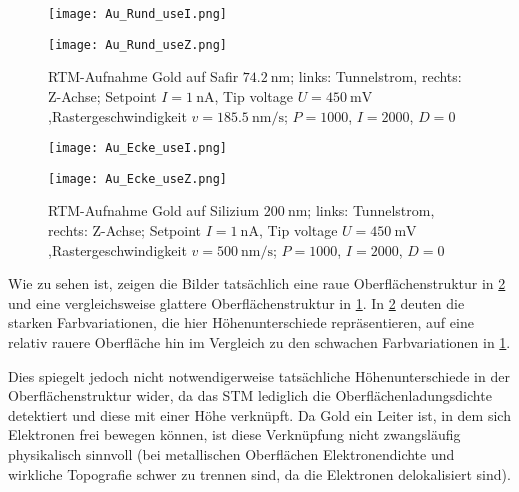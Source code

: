 \begin{figure}[H]
    \centering
    \begin{minipage}[t]{0.495\textwidth}
        \centering
        \texttt{[image: Au\_Rund\_useI.png]}
        \label{fig:goldrund_I}
    \end{minipage}
    \hfill
    \begin{minipage}[t]{0.495\textwidth}
        \centering
        \texttt{[image: Au\_Rund\_useZ.png]}
        \label{fig:goldrund_Z}
    \end{minipage}
    \caption{
      RTM-Aufnahme Gold auf Safir $\SI{74.2}{\nm}$; links: Tunnelstrom, rechts: Z-Achse; Setpoint $I = \SI{1}{\nano\ampere}$, Tip voltage $U = \SI{450}{\milli\volt}$,Rastergeschwindigkeit $v = \SI{185.5}{\nano\meter\per\second}$; $P = 1000$, $I = 2000$, $D = 0$
}
    \label{fig:goldrund_combined}
\end{figure}

\begin{figure}[H]
    \centering
    \begin{minipage}[t]{0.495\textwidth}
        \centering
        \texttt{[image: Au\_Ecke\_useI.png]}
        \label{fig:goldecke_I}
    \end{minipage}
    \hfill
    \begin{minipage}[t]{0.495\textwidth}
        \centering
        \texttt{[image: Au\_Ecke\_useZ.png]}
        \label{fig:goldecke_Z}
    \end{minipage}
    \caption{
      RTM-Aufnahme Gold auf Silizium $\SI{200}{\nm}$; links: Tunnelstrom, rechts: Z-Achse; Setpoint $I = \SI{1}{\nano\ampere}$, Tip voltage $U = \SI{450}{\milli\volt}$,Rastergeschwindigkeit $v = \SI{500}{\nano\meter\per\second}$; $P = 1000$, $I = 2000$, $D = 0$
}
    \label{fig:goldecke_combined}
\end{figure}

Wie zu sehen ist, zeigen die Bilder tatsächlich eine raue Oberflächenstruktur in \cref{fig:goldecke_combined} und eine vergleichsweise glattere Oberflächenstruktur in \cref{fig:goldrund_combined}. 
In \cref{fig:goldecke_combined} deuten die starken Farbvariationen, die hier Höhenunterschiede repräsentieren, auf eine relativ rauere Oberfläche hin im Vergleich zu den schwachen Farbvariationen in \cref{fig:goldrund_combined}.


Dies spiegelt jedoch nicht notwendigerweise tatsächliche Höhenunterschiede in der Oberflächenstruktur wider, da das STM lediglich die Oberflächenladungsdichte detektiert und diese mit einer Höhe verknüpft. 
Da Gold ein Leiter ist, in dem sich Elektronen frei bewegen können, ist diese Verknüpfung nicht zwangsläufig physikalisch sinnvoll (bei metallischen Oberflächen Elektronendichte und wirkliche Topografie schwer zu trennen sind, da die Elektronen delokalisiert sind).

